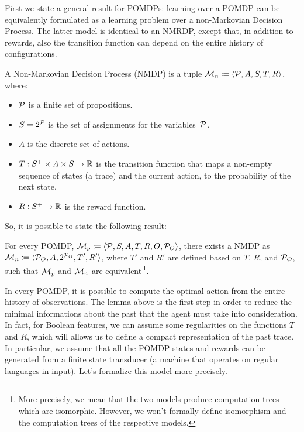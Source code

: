 First we state a general result for POMDPs: learning over a POMDP can be
equivalently formulated as a learning problem over a non-Markovian Decision
Process. The latter model is identical to an NMRDP, except that, in addition
to rewards, also the transition function can depend on the entire history of
configurations.
\begin{definition}
	A Non-Markovian Decision Process (NMDP) is a tuple $\mathcal{M}_n \coloneqq
	\langle \mathcal{P}, A, S, T, R \rangle$, where:
	\begin{itemize}
		\item $\mathcal{P}$ is a finite set of propositions. 
		\item $S = 2^{\mathcal{P}}$ is the set of assignments for the
			variables~$\mathcal{P}$.
		\item $A$ is the discrete set of actions.
		\item $T: S^+ \times A \times S \to \mathbb{R}$ is the transition function that
			maps a non-empty sequence of states (a trace) and the current action, to
			the probability of the next state.
		\item $R: S^+ \to \mathbb{R}$ is the reward function.
	\end{itemize}
	\label{def:nmdp-factored}
\end{definition}
So, it is possible to state the following result:
\begin{lemma}
	\cite{bib:rdp} For every POMDP, $\mathcal{M}_p \coloneqq \langle \mathcal{P},
	S, A, T, R, O, \mathcal{P}_O \rangle$, there exists a NMDP as $\mathcal{M}_n
	\coloneqq \langle \mathcal{P}_O, A, 2^{\mathcal{P}_O}, T', R' \rangle$, where
	$T'$ and $R'$ are defined based on $T$, $R$, and $\mathcal{P}_O$, such that
	$\mathcal{M}_p$ and $\mathcal{M}_n$ are equivalent\,\footnote{More precisely, we
	mean that the two models produce computation trees which are isomorphic.
	However, we won't formally define isomorphism and the computation trees of
	the respective models.}.
\end{lemma}

In every POMDP, it is possible to compute the optimal action from the entire
history of observations. The lemma above is the first step in order to
reduce the minimal informations about the past that the agent must take into
consideration. In fact, for Boolean features, we can assume some
regularities on the functions $T$ and $R$, which will allows us to define a
compact representation of the past trace. In particular, we assume that all
the POMDP states and rewards can be generated from a finite state transducer
(a machine that operates on regular languages in input). Let's formalize this
model more precisely.

